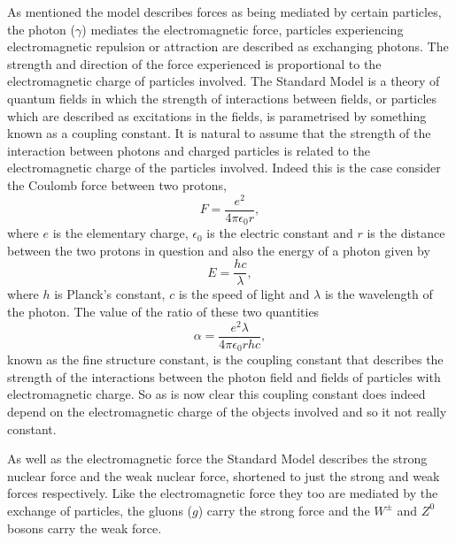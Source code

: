 As mentioned the model describes forces as being mediated by certain particles,
the photon ($\gamma$) mediates the electromagnetic force, particles experiencing
electromagnetic repulsion or attraction are described as exchanging photons. The
strength and direction of the force experienced is proportional to the
electromagnetic charge of particles involved. The Standard Model is a theory of
quantum fields in which the strength of interactions between fields, or
particles which are described as excitations in the fields, is parametrised by
something known as a coupling constant. It is natural to assume that the
strength of the interaction between photons and charged particles is related to
the electromagnetic charge of the particles involved. Indeed this is the case
consider the Coulomb force between two protons,
\begin{equation}
  F = \frac{e^2}{4\pi\epsilon_0r},
\end{equation}
where $e$ is the elementary charge, $\epsilon_0$ is the electric constant and
$r$ is the distance between the two protons in question and also the
energy of a photon given by
\begin{equation}
  E = \frac{hc}{\lambda},
\end{equation}
where $h$ is Planck's constant, $c$ is the speed of light and $\lambda$ is the
wavelength of the photon. The value of the ratio of these two quantities
\begin{equation}
  \label{eq:fine-structure}
  \alpha = \frac{e^{2}\lambda}{4\pi\epsilon_{0}rhc},
\end{equation}
known as the fine structure constant, is the coupling constant that describes
the strength of the interactions between the photon field and fields of
particles with electromagnetic charge. So as is now clear this coupling constant
does indeed depend on the electromagnetic charge of the objects involved and so
it not really constant.

As well as the electromagnetic force the Standard Model describes the strong
nuclear force and the weak nuclear force, shortened to just the strong and weak
forces respectively. Like the electromagnetic force they too are mediated by the
exchange of particles, the gluons ($g$) carry the strong force and the $W^\pm$
and $Z^0$ bosons carry the weak force.

